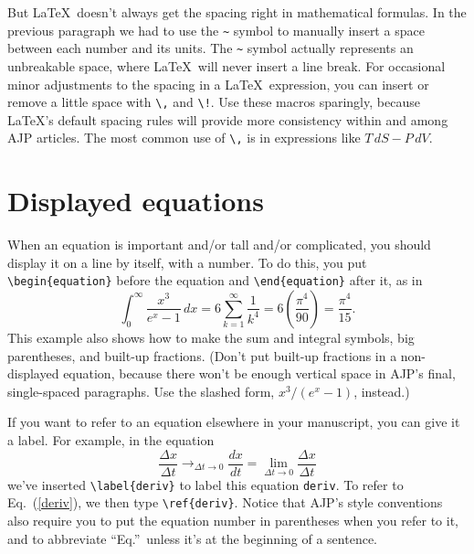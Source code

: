 \documentclass[prb,preprint]{revtex4-2}
\begin{document}
But \LaTeX\ doesn't always get the spacing right in mathematical formulas.
In the previous paragraph we had to use the \verb/~/ symbol to 
manually insert a space between each number and its units.  The \verb/~/
symbol actually represents an unbreakable space, where \LaTeX\ will never
insert a line break. For occasional minor adjustments to the spacing
in a \LaTeX\ expression, you can insert or remove a little 
space with \verb/\,/ and \verb/\!/.  Use these macros sparingly,
because \LaTeX's default spacing rules will provide more consistency
within and among AJP articles.  The most common use of \verb/\,/ 
is in expressions like $T\,dS - P\,dV$.


\section{Displayed equations}
\label{DispEqSection}	%

When an equation is important and/or tall and/or complicated, you should 
display it on a line by itself, with a number. To do this, you put 
\verb/\begin{equation}/ before the equation and \verb/\end{equation}/ 
after it, as in     %
\begin{equation}
\int_0^\infty \! \frac{x^3}{e^x - 1} \, dx = 6\sum_{k=1}^\infty \frac1{k^4} = 
    6\left(\frac{\pi^4}{90}\right) = \frac{\pi^4}{15}.
\end{equation}
This example also shows how to make the sum and integral symbols, big parentheses, 
and built-up fractions.  (Don't put built-up fractions in a 
non-displayed equation, because there won't be enough vertical space in 
AJP's final, single-spaced paragraphs.  Use the slashed form, $x^3/(e^x-1)$, 
instead.)

If you want to refer to an equation elsewhere in your manuscript, you can 
give it a label.  For example, in the equation
\begin{equation}
\label{deriv}
\frac{\Delta x}{\Delta t} \mathop{\longrightarrow}_{\Delta t\rightarrow0} \frac{dx}{dt} 
 = \lim_{\Delta t\rightarrow0} \frac{\Delta x}{\Delta t}
\end{equation}
we've inserted \verb/\label{deriv}/ to label this equation 
\texttt{deriv}.\cite{labelnames}  To refer to 
Eq.~(\ref{deriv}), we then type \verb/\ref{deriv}/.\cite{footnotes}  Notice 
that AJP's style conventions also require you to put the equation number in 
parentheses when you refer to it, and to abbreviate ``Eq.''\ unless it's at 
the beginning of a sentence.
\end{document}
